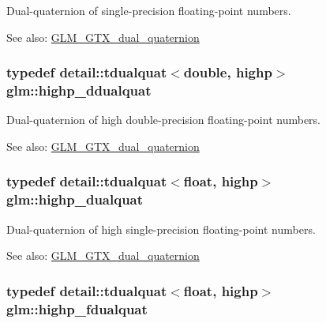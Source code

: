 Dual-quaternion of single-precision floating-point numbers.

\begin{Desc}
\item[See also:]\hyperlink{group__gtc__dual__quaternion}{GLM\_\-GTX\_\-dual\_\-quaternion} \end{Desc}
\hypertarget{group__gtc__dual__quaternion_g61b654c21f080135aedcf23461eb1037}{
\subsubsection[highp\_\-ddualquat]{\setlength{\rightskip}{0pt plus 5cm}typedef detail::tdualquat$<$double, highp$>$ {\bf glm::highp\_\-ddualquat}}}
\label{group__gtc__dual__quaternion_g61b654c21f080135aedcf23461eb1037}


Dual-quaternion of high double-precision floating-point numbers.

\begin{Desc}
\item[See also:]\hyperlink{group__gtc__dual__quaternion}{GLM\_\-GTX\_\-dual\_\-quaternion} \end{Desc}
\hypertarget{group__gtc__dual__quaternion_gf3a01deb502f53ca555ee1d45e6d6776}{
\subsubsection[highp\_\-dualquat]{\setlength{\rightskip}{0pt plus 5cm}typedef detail::tdualquat$<$float, highp$>$ {\bf glm::highp\_\-dualquat}}}
\label{group__gtc__dual__quaternion_gf3a01deb502f53ca555ee1d45e6d6776}


Dual-quaternion of high single-precision floating-point numbers.

\begin{Desc}
\item[See also:]\hyperlink{group__gtc__dual__quaternion}{GLM\_\-GTX\_\-dual\_\-quaternion} \end{Desc}
\hypertarget{group__gtc__dual__quaternion_g2ed3283c09d3ffaf52a0e0a4b248eab6}{
\subsubsection[highp\_\-fdualquat]{\setlength{\rightskip}{0pt plus 5cm}typedef detail::tdualquat$<$float, highp$>$ {\bf glm::highp\_\-fdualquat}}}
\label{group__gtc__dual__quaternion_g2ed3283c09d3ffaf52a0e0a4b248eab6}


